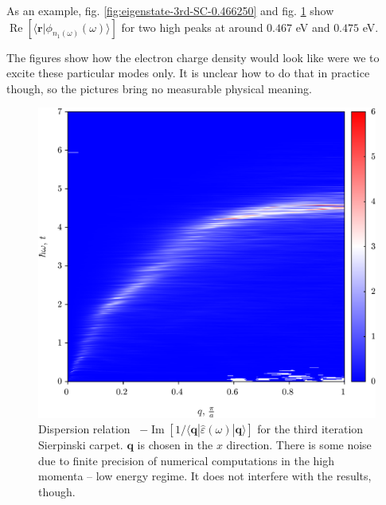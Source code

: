 \documentclass[a4paper,12pt]{article}
\begin{document}
    As an example, fig. \ref{fig:eigenstate-3rd-SC-0.466250} and fig. \ref{fig:eigenstate-3rd-SC-real-0.474250} show $\operatorname{Re} [\langle \mathbf{r} | \phi_{n_1(\omega)}(\omega) \rangle]$ for two high peaks at around $0.467$ eV and $0.475$ eV. 
    \begin{figure}[h] 
    \begin{minipage}{.5\textwidth}
        
        \captionsetup{width=0.9\linewidth}
        \label{fig:eigenstate-3rd-SC-0.466250}
    \end{minipage}%
    \begin{minipage}{.5\textwidth}
        
        \captionsetup{width=0.9\linewidth}
        \label{fig:eigenstate-3rd-SC-real-0.474250}
    \end{minipage}
    \end{figure}
    The figures show how the electron charge density would look like were we to excite these particular modes only. It is unclear how to do that in practice though, so the pictures bring no measurable physical meaning.

    \begin{figure}[h]
    \center
    \includegraphics[width=\textwidth]{Spectrum-3rd-Q-Omega.png}
    \caption{Dispersion relation \ $-\operatorname{Im}[1 / \langle\mathbf{q}| \hat\varepsilon(\omega) |\mathbf{q}\rangle]$ for the third iteration Sierpinski carpet. $\mathbf{q}$ is chosen in the $x$ direction. There is some noise due to finite precision of numerical computations in the high momenta -- low energy regime. It does not interfere with the results, though.}
    \label{fig:spectrum-3rd-Q-Omega}
    \end{figure}
\end{document}
